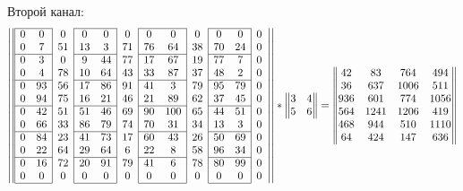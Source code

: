 \documentclass[12pt, a4paper]{extarticle}
\begin{document}
\begin{enumerate}
        Второй канал:
        \begin{equation}
            \left|\left|
            \begin{array}{|cc|c|cc|c|cc|c|cc|c}
                \cline{1-2} \cline{4-5} \cline{7-8} \cline{10-11}
                0 & 0 & 0 & 0 & 0 & 0 & 0 & 0 & 0 & 0 & 0 & 0 \\
                0 & 7 & 51 & 13 & 3 & 71 & 76 & 64 & 38 & 70 & 24 & 0 \\
                \cline{1-2} \cline{4-5} \cline{7-8} \cline{10-11}
                0 & 3 & 0 & 9 & 44 & 77 & 17 & 67 & 19 & 77 & 7 & 0 \\
                0 & 4 & 78 & 10 & 64 & 43 & 33 & 87 & 37 & 48 & 2 & 0 \\
                \cline{1-2} \cline{4-5} \cline{7-8} \cline{10-11}
                0 & 93 & 56 & 17 & 86 & 91 & 41 & 3 & 79 & 95 & 79 & 0 \\
                0 & 94 & 75 & 16 & 21 & 46 & 21 & 89 & 62 & 37 & 45 & 0 \\
                \cline{1-2} \cline{4-5} \cline{7-8} \cline{10-11}
                0 & 42 & 51 & 51 & 46 & 69 & 90 & 100 & 65 & 44 & 51 & 0 \\
                0 & 66 & 33 & 86 & 79 & 74 & 70 & 31 & 34 & 13 & 3 & 0 \\
                \cline{1-2} \cline{4-5} \cline{7-8} \cline{10-11}
                0 & 84 & 23 & 41 & 73 & 17 & 60 & 43 & 26 & 50 & 69 & 0 \\
                0 & 22 & 64 & 29 & 64 & 6 & 22 & 8 & 58 & 96 & 34 & 0 \\
                \cline{1-2} \cline{4-5} \cline{7-8} \cline{10-11}
                0 & 16 & 72 & 20 & 91 & 79 & 41 & 6 & 78 & 80 & 99 & 0 \\
                0 & 0 & 0 & 0 & 0 & 0 & 0 & 0 & 0 & 0 & 0 & 0 \\
                \cline{1-2} \cline{4-5} \cline{7-8} \cline{10-11}
            \end{array}\right|\right|
            \ast
            \begin{Vmatrix}
                3 & 4 \\
                5 & 6
            \end{Vmatrix}
            =
            \begin{Vmatrix}
                42 & 83 & 764 & 494 \\
                36 & 637 & 1006 & 511 \\
                936 & 601 & 774 & 1056 \\
                564 & 1241 & 1206 & 419 \\
                468 & 944 & 510 & 1110 \\
                64 & 424 & 147 & 636 \\
            \end{Vmatrix}
        \end{equation}
        

\end{enumerate}
\end{document}

